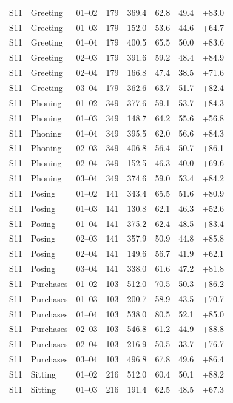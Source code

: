 \begin{center}
{\begin{longtable}{llrrrrrr}
S11 & Greeting & 01--02 & 179 & 369.4 & 62.8 & 49.4 & +83.0 \\
S11 & Greeting & 01--03 & 179 & 152.0 & 53.6 & 44.6 & +64.7 \\
S11 & Greeting & 01--04 & 179 & 400.5 & 65.5 & 50.0 & +83.6 \\
S11 & Greeting & 02--03 & 179 & 391.6 & 59.2 & 48.4 & +84.9 \\
S11 & Greeting & 02--04 & 179 & 166.8 & 47.4 & 38.5 & +71.6 \\
S11 & Greeting & 03--04 & 179 & 362.6 & 63.7 & 51.7 & +82.4 \\
S11 & Phoning & 01--02 & 349 & 377.6 & 59.1 & 53.7 & +84.3 \\
S11 & Phoning & 01--03 & 349 & 148.7 & 64.2 & 55.6 & +56.8 \\
S11 & Phoning & 01--04 & 349 & 395.5 & 62.0 & 56.6 & +84.3 \\
S11 & Phoning & 02--03 & 349 & 406.8 & 56.4 & 50.7 & +86.1 \\
S11 & Phoning & 02--04 & 349 & 152.5 & 46.3 & 40.0 & +69.6 \\
S11 & Phoning & 03--04 & 349 & 374.6 & 59.0 & 53.4 & +84.2 \\
S11 & Posing & 01--02 & 141 & 343.4 & 65.5 & 51.6 & +80.9 \\
S11 & Posing & 01--03 & 141 & 130.8 & 62.1 & 46.3 & +52.6 \\
S11 & Posing & 01--04 & 141 & 375.2 & 62.4 & 48.5 & +83.4 \\
S11 & Posing & 02--03 & 141 & 357.9 & 50.9 & 44.8 & +85.8 \\
S11 & Posing & 02--04 & 141 & 149.6 & 56.7 & 41.9 & +62.1 \\
S11 & Posing & 03--04 & 141 & 338.0 & 61.6 & 47.2 & +81.8 \\
S11 & Purchases & 01--02 & 103 & 512.0 & 70.5 & 50.3 & +86.2 \\
S11 & Purchases & 01--03 & 103 & 200.7 & 58.9 & 43.5 & +70.7 \\
S11 & Purchases & 01--04 & 103 & 538.0 & 80.5 & 52.1 & +85.0 \\
S11 & Purchases & 02--03 & 103 & 546.8 & 61.2 & 44.9 & +88.8 \\
S11 & Purchases & 02--04 & 103 & 216.9 & 50.5 & 33.7 & +76.7 \\
S11 & Purchases & 03--04 & 103 & 496.8 & 67.8 & 49.6 & +86.4 \\
S11 & Sitting & 01--02 & 216 & 512.0 & 60.4 & 50.1 & +88.2 \\
S11 & Sitting & 01--03 & 216 & 191.4 & 62.5 & 48.5 & +67.3 \\

\end{longtable}}
\end{center}
